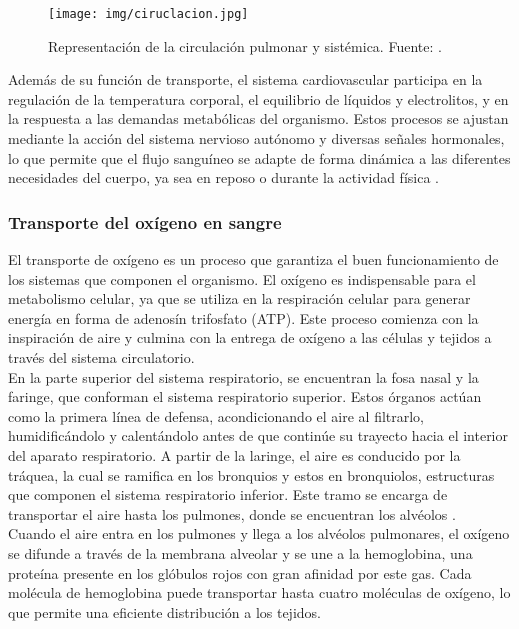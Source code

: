 \begin{figure}[H]
    \centering
    \texttt{[image: img/ciruclacion.jpg]}
    \caption{Representación de la circulación pulmonar y sistémica. Fuente: \cite{genomasur_cap13}.}
    \label{fig:ciruclacion}
\end{figure}

Además de su función de transporte, el sistema cardiovascular participa en la regulación de la temperatura corporal, el equilibrio de líquidos y electrolitos, y en la respuesta a las demandas metabólicas del organismo. Estos procesos se ajustan mediante la acción del sistema nervioso autónomo y diversas señales hormonales, lo que permite que el flujo sanguíneo se adapte de forma dinámica a las diferentes necesidades del cuerpo, ya sea en reposo o durante la actividad física \cite{kenhub2025}.\\



\subsubsection{Transporte del oxígeno en sangre }
El transporte de oxígeno es un proceso que garantiza el buen funcionamiento de los sistemas que componen el organismo. El oxígeno es indispensable para el metabolismo celular, ya que se utiliza en la respiración celular para generar energía en forma de adenosín trifosfato (ATP). Este proceso comienza con la inspiración de aire y culmina con la entrega de oxígeno a las células y tejidos a través del sistema circulatorio.\\ 

En la parte superior del sistema respiratorio, se encuentran la fosa nasal y la faringe, que conforman el sistema respiratorio superior. Estos órganos actúan como la primera línea de defensa, acondicionando el aire al filtrarlo, humidificándolo y calentándolo antes de que continúe su trayecto hacia el interior del aparato respiratorio. A partir de la laringe, el aire es conducido por la tráquea, la cual se ramifica en los bronquios y estos en bronquiolos, estructuras que componen el sistema respiratorio inferior. Este tramo se encarga de transportar el aire hasta los pulmones, donde se encuentran los alvéolos \cite{kenhubSistemasCuerpo2025}. \\

Cuando el aire entra en los pulmones y llega a los alvéolos pulmonares, el oxígeno se difunde a través de la membrana alveolar y se une a la hemoglobina, una proteína presente en los glóbulos rojos con gran afinidad por este gas. Cada molécula de hemoglobina puede transportar hasta cuatro moléculas de oxígeno, lo que permite una eficiente distribución a los tejidos.  \\

